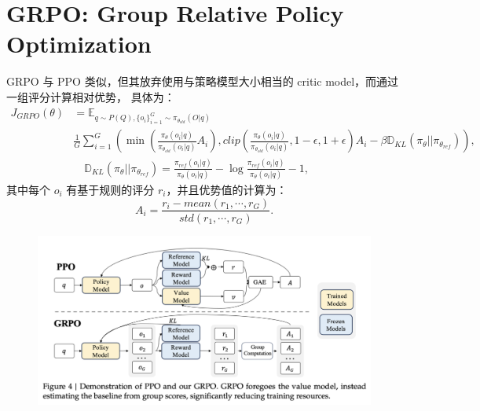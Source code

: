\section{GRPO: Group Relative Policy Optimization}
GRPO 与 PPO 类似，但其放弃使用与策略模型大小相当的 critic model，而通过一组评分计算相对优势，
具体为：
\begin{align}
    J_{GRPO}(\theta) &= \mathbb{E}_{q\sim P(Q),\{o_i\}_{i=1}^G\sim \pi_{\theta_{old}}(O|q)}\\
            &\frac{1}{G}\sum_{i=1}^{G}\left(\min(\frac{\pi_{\theta}(o_i|q)}{\pi_{\theta_{old}}(o_i|q)}A_i),
            clip(\frac{\pi_{\theta}(o_i|q)}{\pi_{\theta_{old}}(o_i|q)},1-\epsilon,1+\epsilon)A_i
            -\beta \mathbb{D}_{KL}(\pi_{\theta}||\pi_{\theta_{ref}})\right),\\
            & \quad \mathbb{D}_{KL}(\pi_{\theta}||\pi_{\theta_{ref}}) = \frac{\pi_{ref}(o_i|q)}{\pi_{\theta}(o_i|q)}
            - \log\frac{\pi_{ref}(o_i|q)}{\pi_{\theta}(o_i|q)} -1,
\end{align}
其中每个 $o_i$ 有基于规则的评分 $r_i$，并且优势值的计算为：
\begin{equation}
    A_i = \frac{r_i - mean({r_1,\cdots,r_G})}{std({r_1,\cdots,r_G})}.
\end{equation}

\begin{figure}[H]
    \centering
    \includegraphics[width=\textwidth]{./fig/PPO GRPO.png}
\end{figure}

